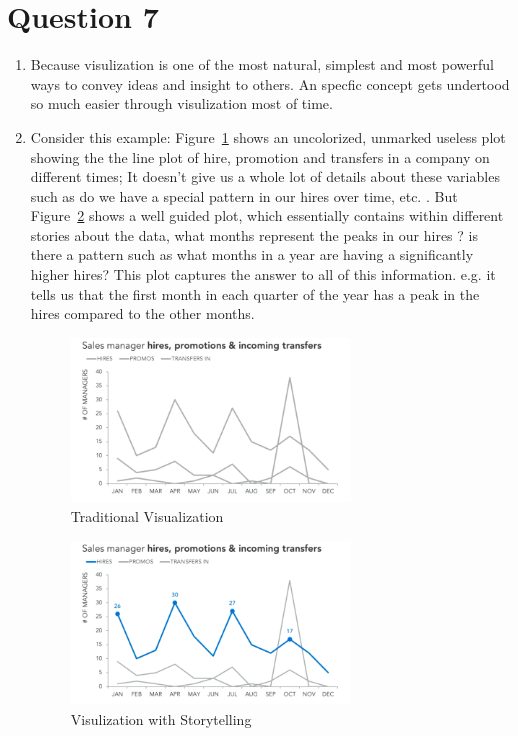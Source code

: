 \documentclass[a4paper,12pt]{article}
\begin{document}
\section*{Question 7}
\begin{enumerate}
    \item Because visulization is one of the most natural, simplest and most powerful ways to convey ideas and insight to others. An specfic concept gets undertood so much easier through visulization most of time.
    \item Consider this example: Figure~\ref{fig:Figure_1} shows an uncolorized, unmarked useless plot showing the the line plot of hire, promotion and transfers in a company on different 
    times; It doesn't give us a whole lot of details about these variables such as do we have a special pattern in our hires over time, etc. . But Figure~\ref{fig:Figure_2} shows a well 
    guided plot, which essentially contains within different stories about the data, what months represent the peaks in our hires ? is there a pattern such as what months in a year are 
    having a significantly higher hires? This plot captures the answer to all of this information. e.g. it tells us that the first month in each quarter of the year has a peak in the hires compared
    to the other months.
    
    \begin{figure}[H]
        \centering
        \includegraphics[width=0.7\textwidth]{traditional_visulization.png}
        \caption{Traditional Visualization}
        \label{fig:Figure_1}
    \end{figure}

    \begin{figure}[H]
        \centering
        \includegraphics[width=0.7\textwidth]{storytelling.png}
        \caption{Visulization with Storytelling}
        \label{fig:Figure_2}
    \end{figure}
    

\end{enumerate}
\end{document}
